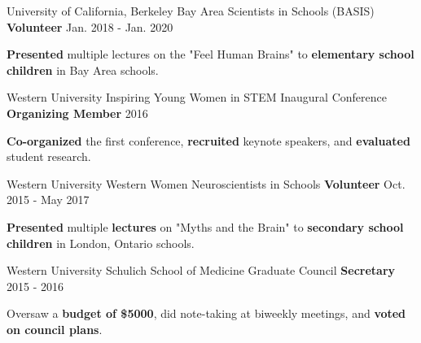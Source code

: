 \begin{cventries}
  \cventry
  	{University of California, Berkeley} %
  	{Bay Area Scientists in Schools (BASIS)}
    {\textbf{Volunteer}} %
    {Jan. 2018 - Jan. 2020} %
    {
      \begin{cvitems} %
        \item {\textbf{Presented} multiple lectures on the "Feel Human Brains" to \textbf{elementary school children} in Bay Area schools.}
      \end{cvitems}
    }
    
  \cventry
    {Western University} %
    {Inspiring Young Women in STEM Inaugural Conference}
    {\textbf{Organizing Member}} %
    {2016} %
    {
      \begin{cvitems} %
        \item {\textbf{Co-organized} the first conference, \textbf{recruited} keynote speakers, and \textbf{evaluated} student research.}
      \end{cvitems}
    }
    
  \cventry
    {Western University}
    {Western Women Neuroscientists in Schools}
  	{\textbf{Volunteer}} %
    {Oct. 2015 - May 2017} %
    {
      \begin{cvitems} %
        \item {\textbf{Presented} multiple \textbf{lectures} on "Myths and the Brain" to \textbf{secondary school children} in London, Ontario schools.}
      \end{cvitems}
    }
    
    
  \cventry
  	{Western University} %
  	{Schulich School of Medicine Graduate Council} %
    {\textbf{Secretary}} %
    {2015 - 2016} %
    {
      \begin{cvitems} %
        \item {Oversaw a \textbf{budget of \$5000}, did note-taking at biweekly meetings, and \textbf{voted on council plans}.}
      \end{cvitems}
    }
    

\end{cventries}
